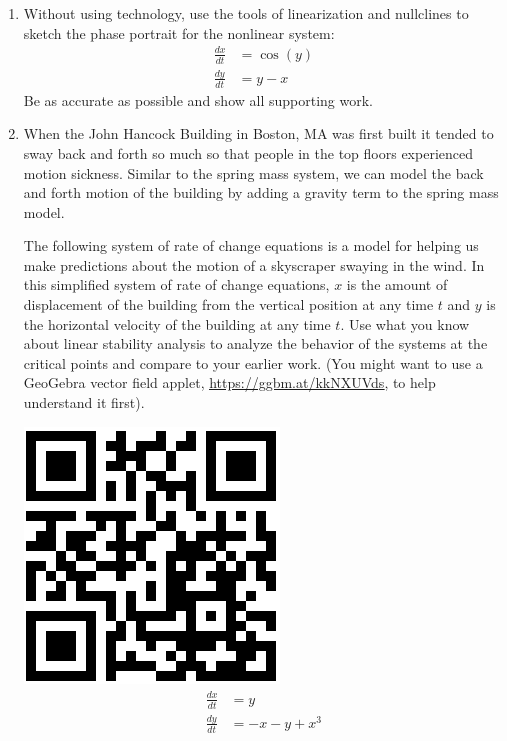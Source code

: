 \begin{enumerate}
\item Without using technology, use the tools of linearization and nullclines to sketch the phase portrait for the nonlinear system: \label{15HWproblem2}
\begin{align*}
\frac{dx}{dt} &=\cos(y) \\
\frac{dy}{dt} &=y-x
\end{align*}
Be as accurate as possible and show all supporting work.

\item When the John Hancock Building in Boston, MA was first built it tended to sway back and forth so much so that people in the top floors experienced motion sickness. Similar to the spring mass system, we can model the back and forth motion of the building by adding a gravity term to the spring mass model.
 
The following system of rate of change equations is a model for helping us make predictions about the motion of a skyscraper swaying in the wind. In this simplified system of rate of change equations, $x$ is the amount of displacement of the building from the vertical position at any time $t$ and $y$ is the horizontal velocity of the building at any time $t$. Use what you know about linear stability analysis to analyze the behavior of the systems at the critical points and compare to your earlier work. (You might want to use a GeoGebra vector field applet, \href{https://ggbm.at/kkNXUVds}{\underline{https://ggbm.at/kkNXUVds}}, to help understand it first). \label{15HWproblem3}

\vspace{-.5in}\hspace{-.6in}\includegraphics[width=.5in]{15/15VectorFieldQR.png}
\begin{align*}
\frac{dx}{dt} &=y \\
\frac{dy}{dt} &=-x-y+x^3
\end{align*}

\clearpage


\end{enumerate}
